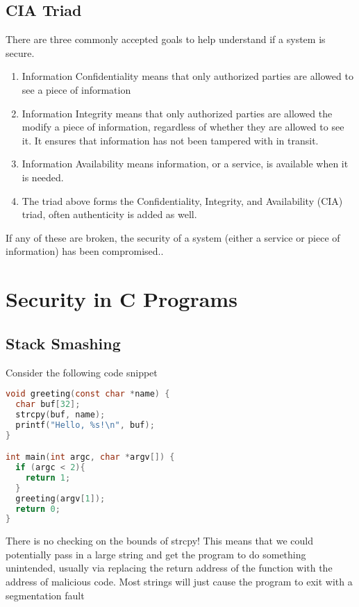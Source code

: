 
\subsection{CIA Triad}

There are three commonly accepted goals to help understand if a system is secure.

\begin{enumerate}
\item Information Confidentiality means that only authorized parties are allowed to see a piece of information
\item Information Integrity means that only authorized parties are allowed the modify a piece of information, regardless of whether they are allowed to see it.
  It ensures that information has not been tampered with in transit.
\item Information Availability means information, or a service, is available when it is needed.
\item The triad above forms the Confidentiality, Integrity, and Availability (CIA) triad, often authenticity is added as well.
\end{enumerate}

If any of these are broken, the security of a system (either a service or piece of information) has been compromised..

\section{Security in C Programs}

\subsection{Stack Smashing}

Consider the following code snippet

\begin{lstlisting}[language=C]
void greeting(const char *name) {
  char buf[32];
  strcpy(buf, name);
  printf("Hello, %s!\n", buf);
}

int main(int argc, char *argv[]) {
  if (argc < 2){
    return 1;
  }
  greeting(argv[1]);
  return 0;
}
\end{lstlisting}

There is no checking on the bounds of strcpy!
This means that we could potentially pass in a large string and get the program to do something unintended, usually via replacing the return address of the function with the address of malicious code.
Most strings will just cause the program to exit with a segmentation fault

